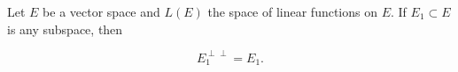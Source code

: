 Let $E$ be a vector space and $L(E)$ the space of linear functions on $E$. If $E_1 \subset E$ is any subspace, then

$$E_1^{\perp\perp} = E_1.$$
